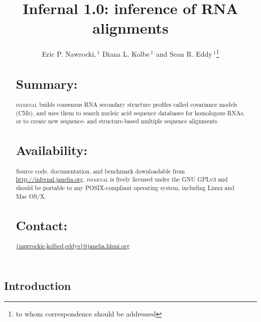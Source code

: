 \documentclass{bioinfo}
\begin{document}

\begin{application}

\title[Infernal 1.0]{Infernal 1.0: inference of RNA alignments}
\author[E. Nawrocki, D. Kolbe and S. Eddy]{Eric P. Nawrocki,\,$^1$ Diana L. Kolbe\,$^1$ and Sean R. Eddy\,$^1$\footnote{to whom correspondence should be addressed}}
\address{$^{1}$HHMI Janelia Farm Research Campus, Ashburn VA 20147, USA\\}



\maketitle


\begin{abstract}
\section{Summary:}
\textsc{infernal} builds consensus RNA secondary structure profiles
called covariance models (CMs), and uses them to search nucleic acid
sequence databases for homologous RNAs, or to create new sequence- and
structure-based multiple sequence alignments.
\section{Availability:}
Source code, documentation, and benchmark downloadable from
\url{http://infernal.janelia.org}. \textsc{infernal} is freely
licensed under the GNU GPLv3 and should be portable to any
POSIX-compliant operating system, including Linux and Mac OS/X.
\section{Contact:} \url{{nawrockie,kolbed,eddys}@janelia.hhmi.org}
\end{abstract}


\section{Introduction}


\end{application}
\end{document}

